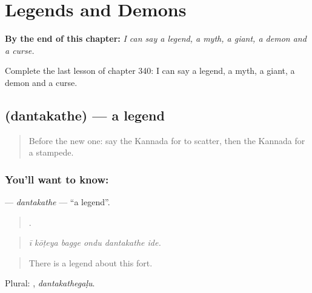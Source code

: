 
\chapter{Legends and Demons}
\label{ch:ka-legends-and-demons}

\begin{chapteropening}
\textbf{By the end of this chapter:} \emph{I can say a legend, a myth, a giant, a demon and a curse.}

Complete the last lesson of chapter 340: I can say a legend, a myth, a giant, a demon and a curse.
\end{chapteropening}

\section[\texorpdfstring{\kn{ದಂತಕಥೆ} (dantakathe)}{ದಂತಕಥೆ (dantakathe)}]{ (dantakathe) — a legend}

\label{lesson:KA-C340-dantakathe}



\begin{quote}
Before the new one: say the Kannada for to scatter, then the Kannada for a stampede.
\end{quote}

\subsection*{You'll want to know: }
\textbf{} — \emph{dantakathe} — \textquotedblleft{}a legend\textquotedblright{}.

\begin{quote}
     .
\end{quote}

\begin{quote}
\emph{ī kōṭeya bagge ondu dantakathe ide.}
\end{quote}

\begin{quote}
There is a legend about this fort.
\end{quote}

Plural: , \emph{dantakathegaḷu}.


